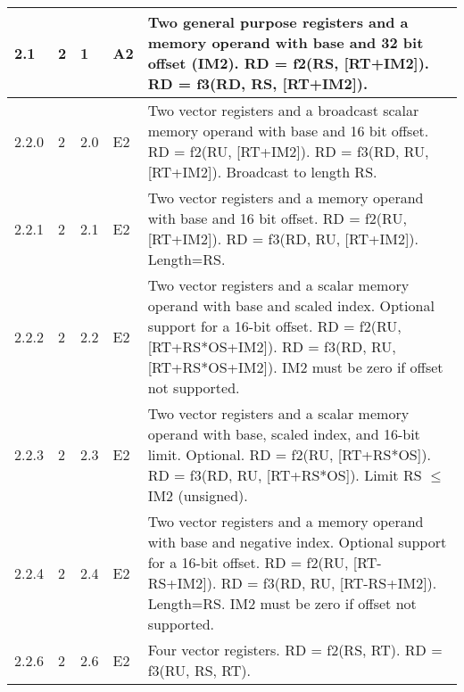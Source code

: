 \documentclass[forwardcom.tex]{subfiles}
\begin{document}
\begin{longtable} {|p{10mm}|p{6mm}|p{9mm}|p{7mm}|p{80mm}|}
\hline
2.1 & 2 & 1 & A2 & Two general purpose registers and a memory operand with base and 32 bit offset (IM2). \newline 
RD = f2(RS, [RT+IM2]). \newline 
RD = f3(RD, RS, [RT+IM2]).\\

\hline
2.2.0 & 2 & 2.0 & E2 & Two vector registers and a broadcast scalar memory operand with base  and 16 bit offset.\newline 
RD = f2(RU, [RT+IM2]). \newline 
RD = f3(RD, RU, [RT+IM2]). \newline
Broadcast to length RS.\\

\hline
2.2.1 & 2 & 2.1 & E2 & Two vector registers and a memory operand with base and 16 bit offset.\newline 
RD = f2(RU, [RT+IM2]). \newline 
RD = f3(RD, RU, [RT+IM2]).\newline
Length=RS.\\

\hline
2.2.2 & 2 & 2.2 & E2 & Two vector registers and a scalar memory operand with base and scaled
index. Optional support for a 16-bit offset.\newline 
RD = f2(RU, [RT+RS*OS+IM2]). \newline 
RD = f3(RD, RU, [RT+RS*OS+IM2]). IM2 must be zero if offset not supported.\\

\hline
2.2.3 & 2 & 2.3 & E2 & Two vector registers and a scalar memory operand with base, scaled index, and 16-bit limit. Optional. \newline 
RD = f2(RU, [RT+RS*OS]). \newline 
RD = f3(RD, RU, [RT+RS*OS]).\newline
Limit RS $\leq$ IM2 (unsigned).\\

\hline
2.2.4 & 2 & 2.4 & E2 & Two vector registers and a memory operand with base and negative index. Optional support for a 16-bit offset.\newline 
RD = f2(RU, [RT-RS+IM2]). \newline 
RD = f3(RD, RU, [RT-RS+IM2]). \newline 
Length=RS.\newline
IM2 must be zero if offset not supported.\\

\hline
2.2.6 & 2 & 2.6 & E2 & Four vector registers.\newline 
RD = f2(RS, RT). \newline 
RD = f3(RU, RS, RT).\\


\end{longtable}
\end{document}
